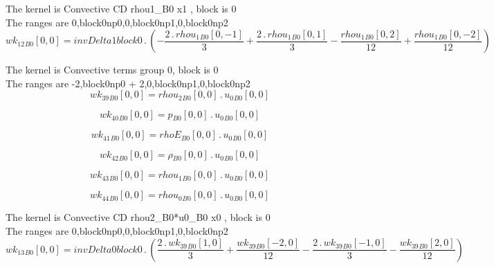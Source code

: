 \documentclass{article}
\begin{document}
\noindent The kernel is Convective CD rhou1_B0 x1 , block is 0\\\noindent The ranges are 0,block0np0,0,block0np1,0,block0np2\\\begin{dmath}{wk_{12}{_{B0}}}[{0,0}] = invDelta1block0 \,.\, \left(- \frac{2 \,.\, {rhou_{1}{_{B0}}}[{0,-1}]}{3} + \frac{2 \,.\, {rhou_{1}{_{B0}}}[{0,1}]}{3} - \frac{{rhou_{1}{_{B0}}}[{0,2}]}{12} + 
\frac{{rhou_{1}{_{B0}}}[{0,-2}]}{12}\right)\end{dmath}

\noindent The kernel is Convective terms group 0, block is 0\\\noindent The ranges are -2,block0np0 + 2,0,block0np1,0,block0np2\\\begin{dmath}{wk_{39}{_{B0}}}[{0,0}] = {rhou_{2}{_{B0}}}[{0,0}] \,.\, {u_{0}{_{B0}}}[{0,0}]\end{dmath}

\begin{dmath}{wk_{40}{_{B0}}}[{0,0}] = {p{_{B0}}}[{0,0}] \,.\, {u_{0}{_{B0}}}[{0,0}]\end{dmath}

\begin{dmath}{wk_{41}{_{B0}}}[{0,0}] = {rhoE{_{B0}}}[{0,0}] \,.\, {u_{0}{_{B0}}}[{0,0}]\end{dmath}

\begin{dmath}{wk_{42}{_{B0}}}[{0,0}] = {\rho{_{B0}}}[{0,0}] \,.\, {u_{0}{_{B0}}}[{0,0}]\end{dmath}

\begin{dmath}{wk_{43}{_{B0}}}[{0,0}] = {rhou_{1}{_{B0}}}[{0,0}] \,.\, {u_{0}{_{B0}}}[{0,0}]\end{dmath}

\begin{dmath}{wk_{44}{_{B0}}}[{0,0}] = {rhou_{0}{_{B0}}}[{0,0}] \,.\, {u_{0}{_{B0}}}[{0,0}]\end{dmath}

\noindent The kernel is Convective CD rhou2_B0*u0_B0 x0 , block is 0\\\noindent The ranges are 0,block0np0,0,block0np1,0,block0np2\\\begin{dmath}{wk_{13}{_{B0}}}[{0,0}] = invDelta0block0 \,.\, \left(\frac{2 \,.\, {wk_{39}{_{B0}}}[{1,0}]}{3} + \frac{{wk_{39}{_{B0}}}[{-2,0}]}{12} - \frac{2 \,.\, {wk_{39}{_{B0}}}[{-1,0}]}{3} - \frac{{wk_{39}{_{B0}}}[{2,0}]}{12}\right)\end{dmath}
\end{document}
